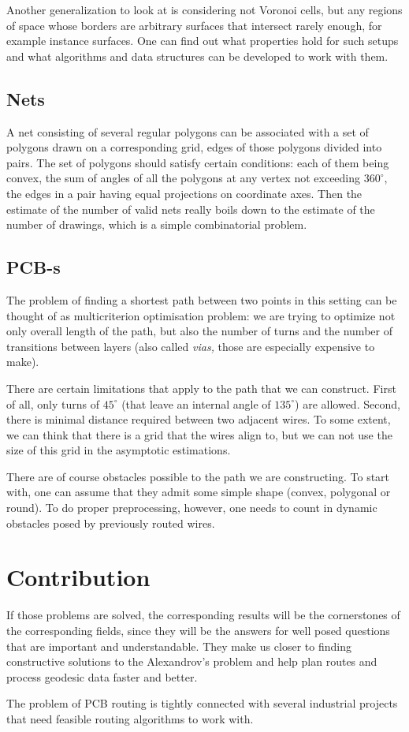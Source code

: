 \documentclass[a4paper,11pt]{article}
\begin{document}
Another generalization to look at is considering not Voronoi cells, but any regions of space whose borders are arbitrary surfaces that intersect rarely enough, for example instance surfaces. One can find out what properties hold for such setups and what algorithms and data structures can be developed to work with them.

\subsection{Nets}

A net consisting of several regular polygons can be associated with a set of polygons drawn on a corresponding grid, edges of those polygons divided into pairs. The set of polygons should satisfy certain conditions: each of them being convex, the sum of angles of all the polygons at any vertex not exceeding \(360^\circ\), the edges in a pair having equal projections on coordinate axes. Then the estimate of the number of valid nets really boils down to the estimate of the number of drawings, which is a simple combinatorial problem.

\subsection{PCB-s}

The problem of finding a shortest path between two points in this setting can be thought of as multicriterion optimisation problem: we are trying to optimize not only overall length of the path, but also the number of turns and the number of transitions between layers (also called {\it vias,} those are especially expensive to make).

There are certain limitations that apply to the path that we can construct. First of all, only turns of $45^\circ$ (that leave an internal angle of $135^\circ$) are allowed. Second, there is minimal distance required between two adjacent wires. To some extent, we can think that there is a grid that the wires align to, but we can not use the size of this grid in the asymptotic estimations.

There are of course obstacles possible to the path we are constructing. To start with, one can assume that they admit some simple shape (convex, polygonal or round). To do proper preprocessing, however, one needs to count in dynamic obstacles posed by previously routed wires.

\section{Contribution}

If those problems are solved, the corresponding results will be the cornerstones of the corresponding fields, since they will be the answers for well posed questions that are important and understandable. They make us closer to finding constructive solutions to the Alexandrov's problem and help plan routes and process geodesic data faster and better.

The problem of PCB routing is tightly connected with several industrial projects that need feasible routing algorithms to work with.

{}

\end{document}
